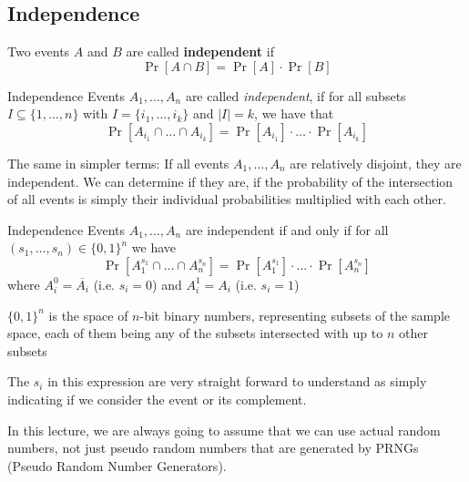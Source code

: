 \newpage
\subsection{Independence}
\setcounter{all}{18}
 Two events $A$ and $B$ are called \textbf{independent} if
\[
    \Pr[A \cap B] = \Pr[A] \cdot \Pr[B]
\]

\setcounter{all}{22}
\begin{definition}[]{Independence}
    Events $A_1, \ldots, A_n$ are called \textit{independent}, if for all subsets $I \subseteq \{1, \ldots, n\}$ with $I = \{i_1, \ldots, i_k\}$ and $|I| = k$, we have that
    \[
        \Pr[A_{i_1} \cap \ldots \cap A_{i_k}] = \Pr[A_{i_1}] \cdot \ldots \cdot \Pr[A_{i_k}]
    \]
\end{definition}

The same in simpler terms: If all events $A_1, \ldots, A_n$ are relatively disjoint, they are independent. We can determine if they are, if the probability of the intersection of all events is simply their individual probabilities multiplied with each other.

\begin{lemma}[]{Independence}
    Events $A_1, \ldots, A_n$ are independent if and only if for all $(s_1, \ldots, s_n) \in \{0, 1\}^n$ we have
    \[
        \Pr[A_1^{s_1} \cap \ldots \cap A_n^{s_n}] = \Pr[A_1^{s_1}] \cdot \ldots \cdot \Pr[A_n^{s_n}]
    \]
    where $A_i^{0} = \overline{A_i}$ (i.e. $s_i = 0$) and $A_i^{1} = A_i$ (i.e. $s_i = 1$)
\end{lemma}
$\{0, 1\}^n$ is the space of $n$-bit binary numbers, representing subsets of the sample space, each of them being any of the subsets intersected with up to $n$ other subsets

The $s_i$ in this expression are very straight forward to understand as simply indicating if we consider the event or its complement. 


In this lecture, we are always going to assume that we can use actual random numbers, not just pseudo random numbers that are generated by PRNGs (Pseudo Random Number Generators).

